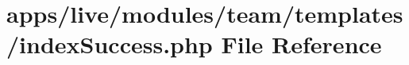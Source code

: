 \hypertarget{live_2modules_2team_2templates_2index_success_8php}{\section{apps/live/modules/team/templates/index\-Success.php File Reference}
\label{live_2modules_2team_2templates_2index_success_8php}
}
